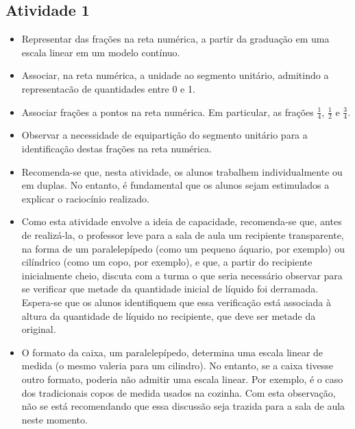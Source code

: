 \documentclass[oneside]{book}
\begin{document}
\begin{multicols}{2}

\subsection{Atividade 1}
\begin{itemize} %
    \item       Representar das frações na reta numérica, a partir da graduação em uma escala linear em um modelo contínuo.
    \item       Associar, na reta numérica, a unidade ao segmento unitário, admitindo a representacão de quantidades entre 0 e 1.
    \item       Associar frações a pontos na reta numérica. Em particular, as frações       $\frac{1}{4}$,       $\frac{1}{2}$       e       $\frac{3}{4}$.
    \item       Observar a necessidade de equipartição do segmento unitário para a identificação destas frações na reta numérica.    
\end{itemize} %
  
      
\begin{itemize} %
    \item       Recomenda-se que, nesta atividade, os alunos trabalhem individualmente ou em duplas. No entanto, é fundamental que os alunos sejam estimulados a explicar o raciocínio realizado.
    \item       Como esta atividade envolve a ideia de capacidade, recomenda-se que, antes de realizá-la, o professor leve para a sala de aula um recipiente transparente, na forma de um paralelepípedo (como um pequeno áquario, por exemplo) ou cilíndrico  (como um copo, por exemplo), e que, a partir do recipiente inicialmente cheio, discuta com a turma o que seria necessário observar para se verificar que metade da quantidade inicial de líquido foi derramada. Espera-se que os alunos identifiquem que essa verificação está associada à altura da quantidade de líquido no recipiente, que deve ser metade da original.  
    \item       O formato da caixa, um paralelepípedo, determina uma escala linear de medida (o mesmo valeria para um cilindro). No entanto, se a caixa tivesse outro formato, poderia não admitir uma escala linear. Por exemplo, é o caso dos tradicionais copos de medida usados na cozinha. Com esta observação, não se está recomendando que essa discussão seja trazida para a sala de aula neste momento. 
\end{itemize} %
  

\end{multicols}
\end{document}
